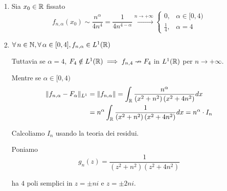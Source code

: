 \Soluzione
\begin{enumerate}
\item Sia $x_{0} \in \RR $ fissato
\begin{equation*}
f_{n, \alpha}(x_{0}) \sim \frac{n^{\alpha}}{4n^{4}} = \frac{1}{4n^{4 - \alpha}}\xrightarrow{n\rightarrow + \infty}
\begin{cases}
0, & \alpha \in [ 0, 4)\\
\frac{1}{4}, & \alpha = 4
\end{cases}
\end{equation*}
\item $\forall n\in \NN, \forall \alpha \in [ 0, 4], f_{n, \alpha} \in L^{1}(\RR)$

Tuttavia se $\alpha = 4$, $F_{4} \notin L^{1}(\RR) \implies f_{n, 4} \nrightarrow F_{4}$ in $L^{1}(\RR)$ per $n\rightarrow + \infty $.

Mentre se $\alpha \in [ 0, 4)$
\begin{equation*}
\begin{aligned}
\Vert f_{n, \alpha} - F_{\alpha}\Vert_{L^{1}} & = \Vert f_{n, \alpha}\Vert = \int_{\RR}\frac{n^{\alpha}}{\left(x^{2} + n^{2}\right)\left(x^{2} + 4n^{2}\right)} dx\\
 & = n^{\alpha}\int_{\RR}\frac{1}{\left(x^{2} + n^{2}\right)\left(x^{2} + 4n^{2}\right)} dx = n^{\alpha} \cdot I_{n}
\end{aligned}
\end{equation*}

Calcoliamo $I_{n}$ usando la teoria dei residui.

Poniamo
\begin{equation*}
g_{n}(z) = \frac{1}{\left(z^{2} + n^{2}\right)\left(z^{2} + 4n^{2}\right)}
\end{equation*}

ha $4$ poli semplici in $z = \pm ni$ e $z = \pm 2ni$.

\begin{figure}[htpb]
	\centering
{} %

\begin{tikzpicture}[x = 0.75pt, y = 0.75pt, yscale = -1, xscale = 1]


\end{tikzpicture}
\end{figure}
\end{enumerate}
